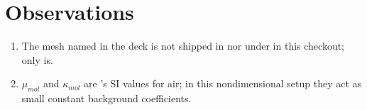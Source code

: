 \documentclass[10pt]{article}
\begin{document}
\section{Observations}
\begin{enumerate}[leftmargin=*]
\item The mesh named in the deck is not shipped in  nor under
 in this checkout; only  is.
\item $\mu_{mol}$ and $\kappa_{mol}$ are 's SI values for air; in this nondimensional
setup they act as small constant background coefficients.
\end{enumerate}


\end{document}
